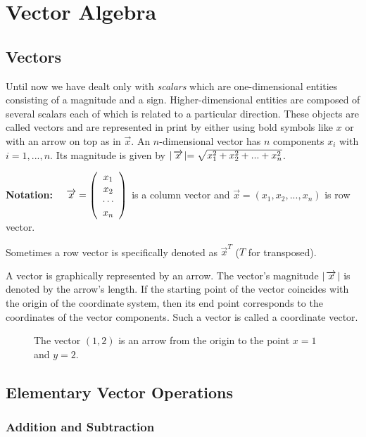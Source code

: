 

\section{Vector Algebra}
\subsection{Vectors}
Until now we have dealt only with  \emph{scalars} which are
one-dimensional entities consisting of a magnitude and a sign.
Higher-dimensional entities are composed of several scalars each
of which is related to a particular direction. These objects are called
vectors and are represented in print by either using bold symbols like
{\boldmath $x$} or with an arrow on top as in $\vec{x}$. An
$n$-dimensional vector has $n$ components $x_i$ with $i=1,...,n$.
Its magnitude is given by $\abs{\vec{x}}=\sqrt{x_1^2+x_2^2+...+x_n^2}$.

{\bf Notation:} $\quad \vec{x}=\left(\ba{c}x_1 \\ x_2 \\ \cdots \\x_n \ea \right)$
is a column vector and $\vec{x} = (x_1, x_2, ..., x_n)$ is row vector.

Sometimes a row vector is specifically denoted as $\vec{x}^T$ ($T$ for transposed).

A vector is graphically represented by an arrow. The vector's magnitude
$\abs{\vec{x}}$ is denoted by the arrow's length. If the starting point of the
vector coincides with the origin of the coordinate system, then
its end point corresponds to the coordinates of the vector components.
Such a vector is called a coordinate vector. \vs

\begin{figure}[!h]
    \centerline{\epsfxsize=8cm  } \svs
    \caption{The vector $(1,2)$ is an arrow from the origin to the point $x=1$ and $y=2$.} \label{fig27}
\end{figure}


\subsection{Elementary Vector Operations}

\subsubsection{Addition and Subtraction}

